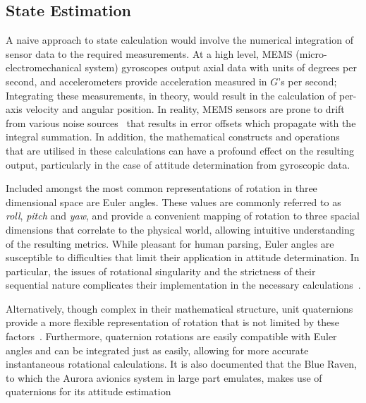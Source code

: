 \subsection{State Estimation}
A naive approach to state calculation would involve the numerical integration of sensor data to the required measurements. At a high level, MEMS (micro-electromechanical system) gyroscopes output axial data with units of degrees per second, and accelerometers provide acceleration measured in $\unit{G}$'s per second; Integrating these measurements, in theory, would result in the calculation of per-axis velocity and angular position. In reality, MEMS sensors are prone to drift from various noise sources~\cite{Diao2013, Pang2001} that results in error offsets which propagate with the integral summation. In addition, the mathematical constructs and operations that are utilised in these calculations can have a profound effect on the resulting output, particularly in the case of attitude determination from gyroscopic data.

Included amongst the most common representations of rotation in three dimensional space are Euler angles. These values are commonly referred to as \textit{roll}, \textit{pitch} and \textit{yaw}, and provide a convenient mapping of rotation to three spacial dimensions that correlate to the physical world, allowing intuitive understanding of the resulting metrics. While pleasant for human parsing, Euler angles are susceptible to difficulties that limit their application in attitude determination. In particular, the issues of rotational singularity and the strictness of their sequential nature complicates their implementation in the necessary calculations~\cite{Hemingway2018, Diebel2006}.

Alternatively, though complex in their mathematical structure, unit quaternions provide a more flexible representation of rotation that is not limited by these factors~\cite{Diebel2006}. Furthermore, quaternion rotations are easily compatible with Euler angles and can be integrated just as easily, allowing for more accurate instantaneous rotational calculations. It is also documented that the Blue Raven, to which the Aurora avionics system in large part emulates, makes use of quaternions for its attitude estimation~\cite{Adamson2023, Adamson2023timeseries}

